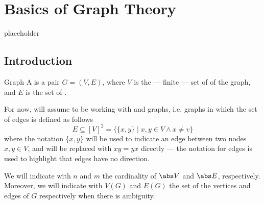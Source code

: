 \documentclass[a4paper, 12pt]{report}
\institute{\curlyquotes{\hspace{0.25mm}Sapienza} Università di Roma}
\subtitle{Appunti integrati con il libro \book}
\author{\textit{Autore}\\\authorName}
\institute{\curlyquotes{\hspace{0.25mm}Sapienza} University of Rome}
\subtitle{Lecture notes integrated with the book \book}
\author{\textit{Author}\\\authorName}
\title{\courseName}
\date{\today}
\begin{document}
    \maketitle

    {
        \hypersetup{allcolors=black}

        \romantableofcontents
    }

    \introduction


    \chapter{Basics of Graph Theory}

    placeholder 

    \section{Introduction}

    \begin{frameddefn}{Graph}
        A  is a pair $G = (V, E)$, where $V$ is the --- finite --- set of  of the graph, and $E$ is the set of .
    \end{frameddefn}

    For now, will assume to be working with  and  graphs, i.e. graphs in which the set of edges is defined as follows $$E \subseteq [V]^2 = \{\{x, y\} \mid x, y \in V \land x \neq v\}$$ where the notation $\{x, y\}$ will be used to indicate an edge between two nodes $x, y \in V$, and will be replaced with $xy = yx$ directly --- the  notation for edges is used to highlight that edges have no direction.

    We will indicate with $n$ and $m$ the cardinality of $\abs V$ and $\abs E$, respectively. Moreover, we will indicate with $V(G)$ and $E(G)$ the set of the vertices and edges of $G$ respectively when there is ambiguity.
\end{document}
